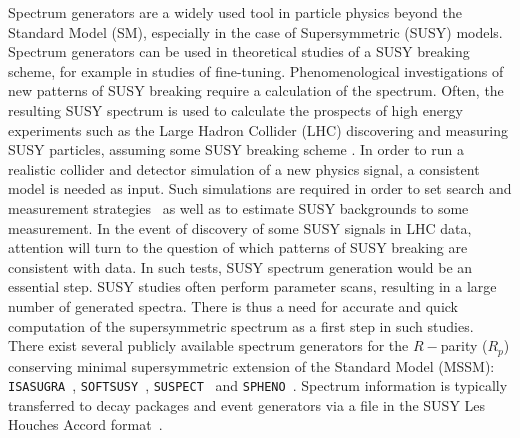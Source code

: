 \documentclass[final,3p,times,pdflatex]{elsarticle}
\def\SOFTSUSY{{\tt SOFTSUSY}}
\def\SUSPECT{{\tt SUSPECT}}
\def\SPHENO{{\tt SPHENO}}
\def\ISASUGRA{{\tt ISASUGRA}}
\begin{document}
Spectrum generators are a widely used tool in particle
physics beyond the Standard Model (SM), especially in the case of
Supersymmetric (SUSY) models. 
Spectrum generators can be used in theoretical studies of a SUSY
breaking scheme, for example in studies of fine-tuning. 
Phenomenological investigations of new
patterns of SUSY breaking require a calculation of the spectrum.  
Often, the resulting SUSY spectrum is used to calculate the prospects of high
energy experiments such as the Large Hadron 
Collider (LHC) discovering and measuring SUSY particles, assuming some 
SUSY breaking scheme \cite{Allanach:2008zn}. In order to run a realistic
collider 
and detector simulation of a new physics signal, a consistent model is needed
as input. Such simulations are required in order to set search and measurement
strategies~\cite{Armstrong:1994it,Bayatian:2006zz} as well as to estimate 
SUSY backgrounds to some measurement. 
In the event of discovery of some SUSY signals in LHC data, attention will
turn to the 
question of which patterns of SUSY breaking are consistent with data. 
In such tests, SUSY
spectrum generation would be an essential step.
SUSY studies often perform parameter scans, resulting in a large number of
generated spectra. 
There is  
thus a need for accurate and quick computation of the supersymmetric spectrum
as a first step in such studies. 
There exist several publicly available spectrum generators for
the $R-$parity ($R_p$) conserving minimal
supersymmetric extension of the Standard Model (MSSM):
\ISASUGRA~\cite{Paige:2003mg}, \SOFTSUSY~\cite{Allanach:2001kg}, 
\SUSPECT~\cite{Djouadi:2002ze} and
\SPHENO~\cite{Porod:2003um}. 
Spectrum information is typically
transferred to decay packages and event generators 
via a file in the SUSY Les Houches Accord
format~\cite{Skands:2003cj,Allanach:2008qq}. 
\end{document}
